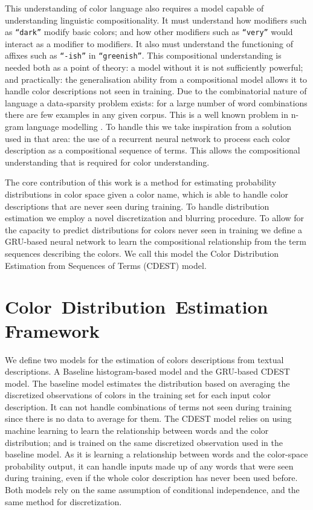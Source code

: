 \documentclass[11pt,a4paper]{article}
\newcommand{\parencite}{\citep}
\begin{document}
This understanding of color language also requires a model capable of understanding linguistic compositionality.
It must understand how modifiers such as \texttt{``dark''} modify basic colors; and  how other modifiers such as \texttt{``very''} would interact as a modifier to modifiers.
It also must understand the functioning of affixes such as \texttt{``-ish''} in \texttt{``greenish''}.
This compositional understanding is needed both as a point of theory: a model without it is not sufficiently powerful; and practically: the generalisation ability from a compositional model allows it to handle color descriptions not seen in training.
Due to the combinatorial nature of language a data-sparsity problem exists:
for a large number of word combinations there are few examples in any given corpus.
This is a well known problem in n-gram language modelling \parencite{kneser1995improved,chen1996empirical,rosenfeld2000two}.
To handle this we take inspiration from a solution used in that area: the use of a recurrent neural network \parencite{mikolov2010recurrent,mikolov2011RnnLM} to process each color description as a compositional sequence of terms.
This allows the compositional understanding that is required for color understanding.


The core contribution of this work is a method for estimating probability distributions in color space given a color name,
 which is able to handle color descriptions that are never seen during training.
To handle distribution estimation we employ a novel discretization and blurring procedure.
To allow for the capacity to predict distributions for colors never seen in training we define a GRU-based neural network to learn the compositional relationship from the term sequences describing the colors.
We call this model the Color Distribution Estimation from Sequences of Terms (CDEST) model.

\section{Color~Distribution~Estimation Framework}\label{sec:method}
We define two models for the estimation of colors descriptions from textual descriptions.
A Baseline histogram-based model and the GRU-based CDEST model.
The baseline model estimates the distribution based on averaging the discretized observations of colors in the training set for each input color description.
It can not handle combinations of terms not seen during training since there is no data to average for them.
The CDEST model relies on using machine learning to learn the relationship between words and the color distribution; and is trained on the same discretized observation used in the baseline model.
As it is learning a relationship between words and the color-space probability output, it can handle inputs made up of any words that were seen during training, even if the whole color description has never been used before.
Both models rely on the same assumption of conditional independence, and the same method for discretization.
\end{document}
